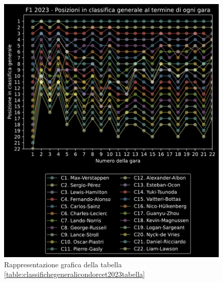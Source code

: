 \documentclass[12pt,a4paper,openright,twoside]{book}
\begin{document}
\begin{figure}[H]
    \centering
     \includegraphics[width=\linewidth]{figures/condorcetstandings2023.pdf}
     \caption{Rappresentazione grafica della tabella \ref{table:classifichegeneralicondorcet2023tabella} }
     \label{fig:classifichegeneralicondorcet2023figura}
 \end{figure}
\end{document}
